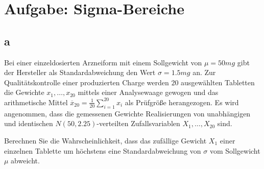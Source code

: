 \section{Aufgabe: Sigma-Bereiche}

\subsection{a}

Bei einer einzeldosierten Arzneiform mit einem Sollgewicht von $\mu = 50mg$
gibt der Hersteller als Standardabweichung den Wert $\sigma = 1.5mg$ an. Zur
Qualitätskontrolle einer produzierten Charge werden $20$ ausgewählten Tabletten
die Gewichte $x_1, \dots, x_{20}$ mittels einer Analysewaage gewogen und das
arithmetische Mittel $\overline{x}_{20} = \frac{1}{20} \sum_{i = 1}^{20} x_i$
als Prüfgröße herangezogen. Es wird angenommen, dass die gemessenen Gewichte
Realisierungen von unabhängigen und identischen $N(50, 2.25)$-verteilten
Zufallsvariablen $X_1, \dots, X_{20}$ sind.

Berechnen Sie die Wahrscheinlichkeit, dass das zufällige Gewicht $X_1$ einer
einzelnen Tablette um höchstens eine Standardabweichung von $\sigma$ vom
Sollgewicht $\mu$ abweicht.

